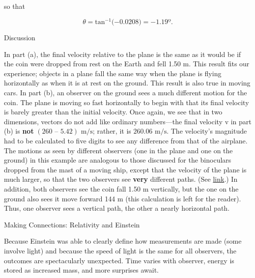 \documentclass[
]{book}
\newenvironment{tinysection}{}{}
\newenvironment{note}{}{}
\begin{document}
so that

\leavevmode\hypertarget{eip-328}{}%
\[{{\theta = \text{tan}^{- 1}}{( - 0}\text{.}\text{0208}{) = {- 1}}\text{.}\text{19º}}\text{.}\]

\begin{tinysection}

{Discussion}

\end{tinysection}

In part (a), the final velocity relative to the plane is the same as it
would be if the coin were dropped from rest on the Earth and fell 1.50
m. This result fits our experience; objects in a plane fall the same way
when the plane is flying horizontally as when it is at rest on the
ground. This result is also true in moving cars. In part (b), an
observer on the ground sees a much different motion for the coin. The
plane is moving so fast horizontally to begin with that its final
velocity is barely greater than the initial velocity. Once again, we see
that in two dimensions, vectors do not add like ordinary numbers---the
final velocity v in part (b) is \textbf{not}
\({(\text{260\ –\ 5}\text{.}\text{42})\text{~m/s}}{}\); rather, it is
\({\text{260}\text{.}\text{06~m/s}}{}\). The velocity's magnitude had to
be calculated to five digits to see any difference from that of the
airplane. The motions as seen by different observers (one in the plane
and one on the ground) in this example are analogous to those discussed
for the binoculars dropped from the mast of a moving ship, except that
the velocity of the plane is much larger, so that the two observers see
\textbf{very} different paths. (See
\protect\hyperlink{import-auto-id1944737}{link}.) In addition,
both observers see the coin fall 1.50 m vertically, but the one on the
ground also sees it move forward 144 m (this calculation is left for the
reader). Thus, one observer sees a vertical path, the other a nearly
horizontal path.

\hypertarget{fs-id1820082}{}
\begin{note}

Making Connections: Relativity and Einstein

Because Einstein was able to clearly define how measurements are made
(some involve light) and because the speed of light is the same for all
observers, the outcomes are spectacularly unexpected. Time varies with
observer, energy is stored as increased mass, and more surprises await.

\end{note}
\end{document}
